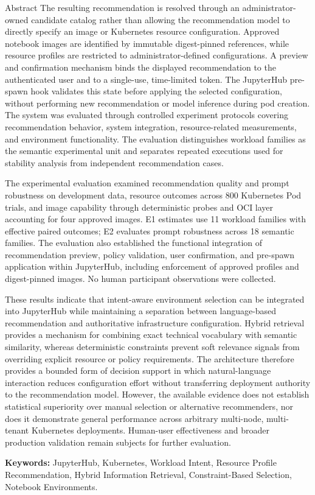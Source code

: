 \documentclass{uetgraduation}
\begin{document}
\begin{preamble}{Abstract}
The resulting recommendation is resolved through an administrator-owned candidate catalog rather than allowing the recommendation model to directly specify an image or Kubernetes resource configuration. Approved notebook images are identified by immutable digest-pinned references, while resource profiles are restricted to administrator-defined configurations. A preview and confirmation mechanism binds the displayed recommendation to the authenticated user and to a single-use, time-limited token. The JupyterHub pre-spawn hook validates this state before applying the selected configuration, without performing new recommendation or model inference during pod creation. The system was evaluated through controlled experiment protocols covering recommendation behavior, system integration, resource-related measurements, and environment functionality. The evaluation distinguishes workload families as the semantic experimental unit and separates repeated executions used for stability analysis from independent recommendation cases.

The experimental evaluation examined recommendation quality and prompt robustness on development data, resource outcomes across 800 Kubernetes Pod trials, and image capability through deterministic probes and OCI layer accounting for four approved images. E1 estimates use 11 workload families with effective paired outcomes; E2 evaluates prompt robustness across 18 semantic families. The evaluation also established the functional integration of recommendation preview, policy validation, user confirmation, and pre-spawn application within JupyterHub, including enforcement of approved profiles and digest-pinned images. No human participant observations were collected.

These results indicate that intent-aware environment selection can be integrated into JupyterHub while maintaining a separation between language-based recommendation and authoritative infrastructure configuration. Hybrid retrieval provides a mechanism for combining exact technical vocabulary with semantic similarity, whereas deterministic constraints prevent soft relevance signals from overriding explicit resource or policy requirements. The architecture therefore provides a bounded form of decision support in which natural-language interaction reduces configuration effort without transferring deployment authority to the recommendation model. However, the available evidence does not establish statistical superiority over manual selection or alternative recommenders, nor does it demonstrate general performance across arbitrary multi-node, multi-tenant Kubernetes deployments. Human-user effectiveness and broader production validation remain subjects for further evaluation.

\textbf{Keywords:} JupyterHub, Kubernetes, Workload Intent, Resource Profile Recommendation, Hybrid Information Retrieval, Constraint-Based Selection, Notebook Environments.
\end{preamble}
\end{document}
